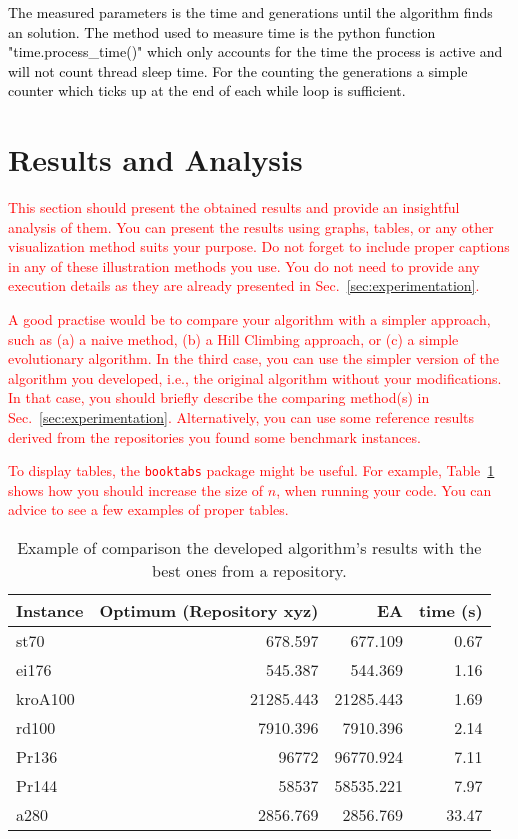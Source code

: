 \documentclass{scrartcl}
\begin{document}
\textcolor{black}{The measured parameters is the time and generations until the algorithm finds an solution. The method used to measure time is the python function "time.process\_time()" which only accounts for the time the process is active and will not count thread sleep time. For the counting the generations a simple counter which ticks up at the end of each while loop is sufficient.}

\section{Results and Analysis}
\label{sec:results-analysis}

\textcolor{red}{This section should present the obtained results and provide an insightful analysis of them. You can present the results using graphs, tables, or any other visualization method suits your purpose. Do not forget to include proper captions \cite{zobel2014graphs} in any of these illustration methods you use. You do not need to provide any execution details as they are already presented in Sec.~\ref{sec:experimentation}.}

\textcolor{red}{A good practise would be to compare your algorithm with a simpler approach, such as (a) a naive method, (b) a Hill Climbing approach, or (c) a simple evolutionary algorithm. In the third case, you can use the simpler version of the algorithm you developed, i.e., the original algorithm without your modifications. In that case, you should briefly describe the comparing method(s) in Sec.~\ref{sec:experimentation}. Alternatively, you can use some reference results derived from the repositories you found some benchmark instances.}

\textcolor{red}{To display tables, the \texttt{booktabs} package might be useful. For example, Table~\ref{tab:results_example} shows how you should increase the  size of $n$, when running your code. You can advice \cite{zobel2014graphs} to see a few examples of proper tables.}

\begin{table}[h]
\centering
\caption{Example of comparison the developed algorithm's results with the best ones from a repository.}
\label{tab:results_example}
	\begin{tabular}{lrrr}
	\toprule
	\textbf{Instance} & \textbf{Optimum (Repository xyz)} & \textbf{EA} & \textbf{time (s)}\\
	\midrule
	st70       &  678.597      & 677.109	& 0.67\\
	ei176      &  545.387      & 544.369	& 1.16\\
	kroA100    &  21285.443    & 21285.443	& 1.69\\
	rd100      &  7910.396     & 7910.396	& 2.14\\
	Pr136      &  96772        & 96770.924	& 7.11\\
	Pr144      &  58537        & 58535.221	& 7.97\\
	a280       &  2856.769     & 2856.769	& 33.47\\
	\bottomrule
	\end{tabular}
\end{table}
\end{document}
